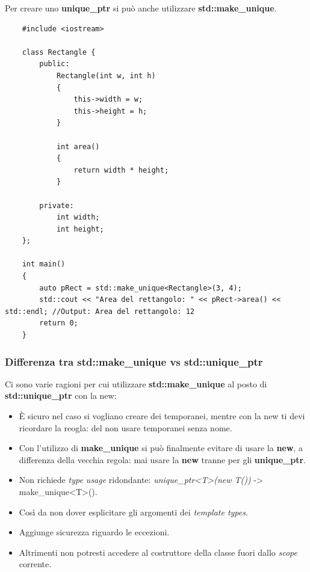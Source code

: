 \textsf{\small Per creare uno \textbf{unique\_ptr} si può anche utilizzare \textbf{std::make\_unique}.} \\

\begin{lstlisting}
	#include <iostream>
	
	class Rectangle {
		public:
			Rectangle(int w, int h)
			{
				this->width = w;
				this->height = h;
			}
		
			int area()
			{
				return width * height;
			}
		
		private:
			int width;
			int height;
	};

	int main()
	{
		auto pRect = std::make_unique<Rectangle>(3, 4);
		std::cout << "Area del rettangolo: " << pRect->area() << std::endl; //Output: Area del rettangolo: 12
		return 0;
	}
\end{lstlisting}

\subsubsection{Differenza tra std::make\_unique vs std::unique\_ptr}

\textsf{\small Ci sono varie ragioni per cui utilizzare \textbf{std::make\_unique} al posto di \textbf{std::unique\_ptr} con la new: } \\

\begin{itemize}
	\item \textsf{\small È sicuro nel caso si vogliano creare dei temporanei, mentre con la new ti devi ricordare la reogla: del non usare temporanei senza nome. } 
	\item \textsf{\small Con l'utilizzo di \textbf{make\_unique} si può finalmente evitare di usare la \textbf{new}, a differenza della vecchia regola: mai usare la \textbf{new} tranne per gli \textbf{unique\_ptr}.} 
	\item \textsf{\small Non richiede \emph{type usage} ridondante: \emph{unique\_ptr<T>(new T())} -> make\_unique<T>().} \\
	\item \textsf{\small Così da non dover esplicitare gli argomenti dei \emph{template types}.}
	\item \textsf{\small Aggiunge sicurezza riguardo le eccezioni.}
	\item \textsf{\small Altrimenti non potresti accedere al costruttore della classe fuori dallo \emph{scope} corrente.}
\end{itemize}

